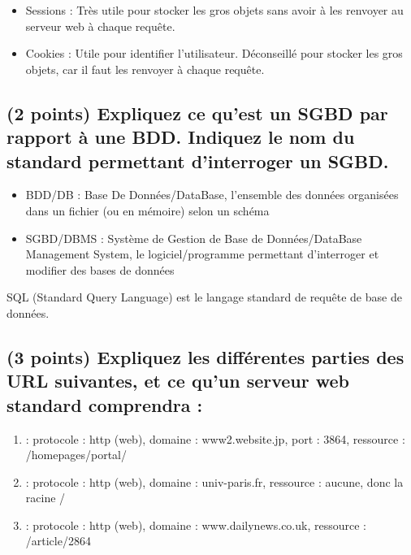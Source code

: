 \documentclass[11pt,a4paper]{article}
\begin{document}
\bigskip

\begin{itemize}
\item Sessions : Très utile pour stocker les gros objets sans avoir à les renvoyer au serveur web à chaque requête.
\item Cookies : Utile pour identifier l'utilisateur. Déconseillé pour stocker les gros objets, car il faut les renvoyer à chaque requête.
\end{itemize}

\bigskip

\subsection{(2 points) Expliquez ce qu'est un SGBD par rapport à une BDD. Indiquez le nom du standard permettant d'interroger un SGBD.}

\bigskip

\begin{itemize}
\item BDD/DB : Base De Données/DataBase, l'ensemble des données organisées dans un fichier (ou en mémoire) selon un schéma
\item SGBD/DBMS : Système de Gestion de Base de Données/DataBase Management System, le logiciel/programme permettant d'interroger et modifier des bases de données
\end{itemize}

SQL (Standard Query Language) est le langage standard de requête de base de données.

\bigskip

\subsection{(3 points) Expliquez les différentes parties des URL suivantes, et ce qu'un serveur web standard comprendra :}

\bigskip

\begin{enumerate}
\item {} : protocole : http (web), domaine : www2.website.jp, port : 3864, ressource : /homepages/portal/
\item {} : protocole : http (web), domaine : univ-paris.fr, ressource : aucune, donc la racine /
\item {} : protocole : http (web), domaine : www.dailynews.co.uk, ressource : /article/2864
\end{enumerate}
\end{document}
